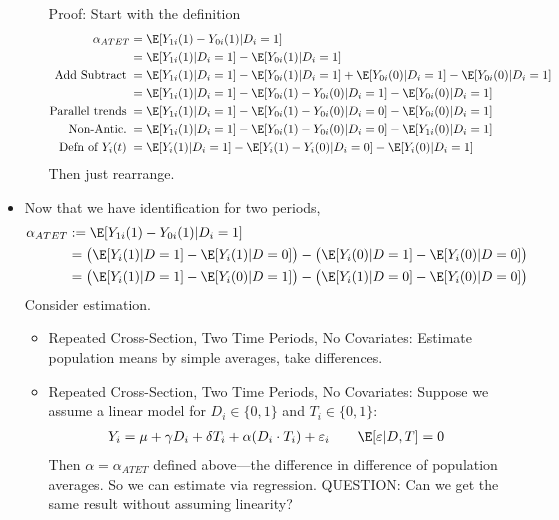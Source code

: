\documentclass[12pt]{article}
\theoremstyle{plain}
\theoremstyle{definition}
\theoremstyle{remark}
\begin{document}
\begin{itemize}
\begin{itemize}
        Proof:
        Start with the definition
        \begin{align*}
          \alpha_{ATET}
          &= \E[Y_{1i}(1)-Y_{0i}(1)|D_i=1]
          \\
          &=
          \E[Y_{1i}(1)|D_i=1]
          -
          \E[Y_{0i}(1)|D_i=1]
          \\
          \text{Add Subtract}\;
          &=
          \E[Y_{1i}(1)|D_i=1]
          - \E[Y_{0i}(1)|D_i=1]
          + \E[Y_{0i}(0)|D_i=1]
          - \E[Y_{0i}(0)|D_i=1]
          \\
          &=
          \E[Y_{1i}(1)|D_i=1]
          - \E[Y_{0i}(1)-Y_{0i}(0)|D_i=1]
          - \E[Y_{0i}(0)|D_i=1]
          \\
          \text{Parallel trends}\;
          &=
          \E[Y_{1i}(1)|D_i=1]
          - \E[Y_{0i}(1)-Y_{0i}(0)|D_i=0]
          - \E[Y_{0i}(0)|D_i=1]
          \\
          \text{Non-Antic.}\;
          &=
          \E[Y_{1i}(1)|D_i=1]
          - \E[Y_{0i}(1)-Y_{0i}(0)|D_i=0]
          - \E[Y_{1i}(0)|D_i=1]
          \\
          \text{Defn of $Y_i(t)$}\;
          &=
          \E[Y_{i}(1)|D_i=1]
          - \E[Y_{i}(1)-Y_{i}(0)|D_i=0]
          - \E[Y_{i}(0)|D_i=1]
        \end{align*}
        Then just rearrange.
    \end{itemize}

  \item Now that we have identification for two periods,
    \begin{align*}
      \alpha_{ATET}
      &:= \E[Y_{1i}(1)-Y_{0i}(1)|D_i=1]
      \\
      &=
      \big(
      \E[Y_i(1)|D=1]
      -
      \E[Y_i(1)|D=0]
      \big)
      -
      \big(
      \E[Y_i(0)|D=1]
      -
      \E[Y_i(0)|D=0]
      \big)
      \\
      &=
      \big(
      \E[Y_i(1)|D=1]
      -
      \E[Y_i(0)|D=1]
      \big)
      -
      \big(
      \E[Y_i(1)|D=0]
      -
      \E[Y_i(0)|D=0]
      \big)
    \end{align*}
    Consider estimation.
    \begin{itemize}
      \item Repeated Cross-Section, Two Time Periods, No Covariates:
        Estimate population means by simple averages, take differences.
      \item Repeated Cross-Section, Two Time Periods, No Covariates:
        Suppose we assume a linear model
        for $D_i\in\{0,1\}$ and $T_i\in\{0,1\}$:
        \begin{align*}
          Y_i =
          \mu + \gamma D_i + \delta T_i + \alpha (D_i\cdot T_i)
          + \varepsilon_i
          \qquad
          \E[\varepsilon|D,T]=0
        \end{align*}
        Then $\alpha=\alpha_{ATET}$ defined above---the difference in
        difference of population averages.
        So we can estimate via regression.
        QUESTION: Can we get the same result without assuming linearity?


\end{itemize}
\end{itemize}
\end{document}
